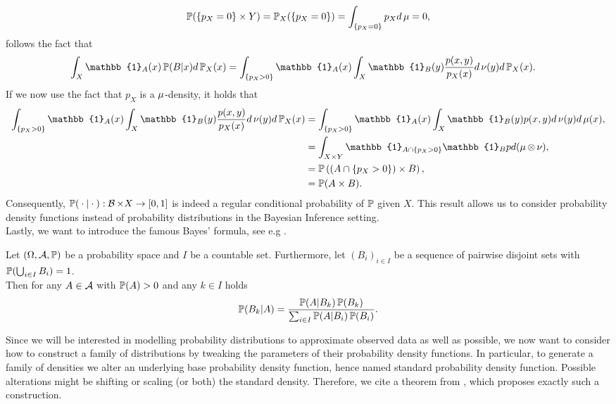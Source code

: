 \begin{align*}
\operatorname{\mathbb{P}}(\{p_X = 0\} \times Y) = \operatorname{\mathbb{P}}_X(\{p_X = 0\}) = \int_{\{p_X = 0\}} p_X d\operatorname{\mu} = 0,
\end{align*}
follows the fact that
\begin{align*}
\int_X \mathbb{1}_A(x) \prob(B|x)d\prob_X(x) &= \int_{\{p_X > 0\}} \mathbb{1}_A(x) \int_X \mathbb{1}_B(y) \frac{p(x, y)}{p_X(x)} d\n(y) d\prob_X(x).
\end{align*}
If we now use the fact that $p_X$ is a $\operatorname{\mu}$-density, it holds that
\begin{align*}
\int_{\{p_X > 0\}} \mathbb{1}_A(x) \int_X \mathbb{1}_B(y) \frac{p(x, y)}{p_X(x)} d\n(y) d\prob_X(x) &= \int_{\{p_X >0\}} \mathbb{1}_A(x) \int_X \mathbb{1}_B(y) p(x, y) d\n(y) d\m(x),\\
&= \int_{X \times Y} \mathbb{1}_{A \cap \{p_X > 0\}} \mathbb{1}_Bp d(\m \otimes \n),\\
&= \prob\left( (A \cap \{p_X > 0\}) \times B \right),\\
&= \prob (A \times B).
\end{align*}
Consequently, $\operatorname{\mathbb{P}}({}\cdot{} |{}\cdot{}):\operatorname{\mathcal{B}} \times X\to [0, 1]$ is indeed a regular conditional probability of $\operatorname{\mathbb{P}}$ given $X$. This result allows us to consider probability density functions instead of probability distributions in the Bayesian Inference setting.\\
Lastly, we want to introduce the famous Bayes' formula, see e.g \cite[Theorem~8.7]{klenke2013probability}.

\begin{theorem}\label{theorem:bayes_rule}
Let $(\Omega, \operatorname{\mathcal{A}}, \operatorname{\mathbb{P}})$ be a probability space and $I$ be a countable set. Furthermore, let $(B_i)_{i\in I}$ be a sequence of pairwise disjoint sets with $\operatorname{\mathbb{P}} (\bigcup_{i\in I} B_i) = 1$.\\
Then for any $A\in\operatorname{\mathcal{A}}$ with $\operatorname{\mathbb{P}}(A) > 0$ and any $k\in I$ holds
\begin{align*}
\operatorname{\mathbb{P}}(B_k | A) = \frac{\operatorname{\mathbb{P}}(A | B_k) \operatorname{\mathbb{P}}(B_k)}{\sum_{i \in I} \operatorname{\mathbb{P}}(A | B_i) \operatorname{\mathbb{P}}(B_i)}.
\end{align*}
\end{theorem}

Since we will be interested in modelling probability distributions to approximate observed data as well as possible, we now want to consider how to construct a family of distributions by tweaking the parameters of their probability density functions. In particular, to generate a family of densities we alter an underlying base probability density function, hence named standard probability density function. Possible alterations might be shifting or scaling (or both) the standard density. Therefore, we cite a theorem from \cite[Theorem~2.1]{cinelli2021variational}, which proposes exactly such a construction.

